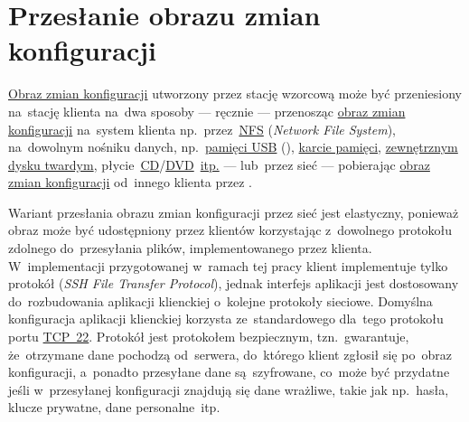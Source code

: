 \documentclass[thesis]{subfiles}
\begin{document}

\section{Przesłanie obrazu zmian konfiguracji}
\label{sec:przeslanie-obrazu-konfiguracji}

\hyperref[sec:obraz-zmian-konfiguracji]{Obraz zmian konfiguracji} utworzony przez stację wzorcową może być przeniesiony na~stację klienta na~dwa sposoby --- ręcznie --- przenosząc \hyperref[sec:obraz-zmian-konfiguracji]{obraz zmian konfiguracji} na~system klienta np.~przez~\href{https://en.wikipedia.org/wiki/Network_File_System}{NFS} (\emph{Network File System}), na~dowolnym nośniku danych, np.~\href{https://en.wikipedia.org/wiki/USB_flash_drive}{pamięci USB} (), \href{https://en.wikipedia.org/wiki/Memory_card}{karcie pamięci}, \href{https://en.wikipedia.org/wiki/Hard_disk_drive\#External_hard_disk_drives}{zewnętrznym dysku twardym}, płycie~\href{https://en.wikipedia.org/wiki/Compact_disc}{CD}/\href{https://en.wikipedia.org/wiki/DVD}{DVD}~\href{https://en.wikipedia.org/wiki/USB_mass_storage_device_class}{itp.} --- lub~przez sieć --- pobierając \hyperref[sec:obraz-zmian-konfiguracji]{obraz zmian konfiguracji} od~innego klienta przez \sftp{}.

Wariant przesłania obrazu zmian konfiguracji przez sieć jest elastyczny, ponieważ obraz może być udostępniony przez klientów korzystając z~dowolnego protokołu zdolnego do~przesyłania plików, implementowanego przez klienta. W~implementacji przygotowanej w~ramach tej pracy klient implementuje tylko protokół \sftp{} (\emph{SSH File Transfer Protocol}), jednak interfejs aplikacji jest dostosowany do~rozbudowania aplikacji klienckiej o~kolejne protokoły sieciowe. Domyślna konfiguracja aplikacji klienckiej korzysta ze~standardowego dla~tego protokołu portu \href{https://www.iana.org/assignments/service-names-port-numbers/service-names-port-numbers.xhtml?search=22}{TCP~22}. Protokół \sftp{} jest protokołem bezpiecznym, tzn.~gwarantuje, że~otrzymane dane pochodzą od~serwera, do~którego klient zgłosił się po~obraz konfiguracji, a~ponadto przesyłane dane są~szyfrowane, co~może być przydatne jeśli w~przesyłanej konfiguracji znajdują się dane wrażliwe, takie jak np.~hasła, klucze prywatne, dane personalne~itp.

\end{document}
